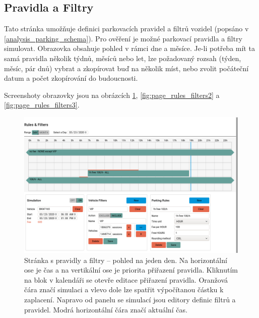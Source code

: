 \subsection{Pravidla a Filtry}

\noindent
Tato stránka umožňuje definici parkovacích pravidel a filtrů vozidel (popsáno v \ref{analysis_parking_schema}).
Pro ověření je možné parkovací pravidla a filtry simulovat.
Obrazovka obsahuje pohled v rámci dne a měsíce.
Je-li potřeba mít ta samá pravidla několik týdnů, měsíců nebo let, lze požadovaný rozsah (týden, měsíc, pár dnů) vybrat
a zkopírovat buď na několik míst, nebo zvolit počáteční datum a počet zkopírování do budoucnosti.

Screenshoty obrazovky jsou na obrázcích \ref{fig:page_rules_filters1}, \ref{fig:page_rules_filters2} a \ref{fig:page_rules_filters3}.

\begin{figure}[htb!] \centering
  \includegraphics[width=145mm]{../img/page_rules_filters1.png}
  \caption[Stránka s pravidly a filtry -- pohled na jeden den.]{Stránka s pravidly a filtry -- pohled na jeden den.
  Na horizontální ose je čas a na vertikální ose je priorita přiřazení pravidla.
  Kliknutím na blok v kalendáři se otevře editace přiřazení pravidla. Oranžová čára značí simulaci a vlevo
  dole lze spatřit výpočítanou částku k zaplacení. Napravo od panelu se simulací jsou editory definic filtrů
  a pravidel. Modrá horizontální čára značí aktuální čas.}
  \label{fig:page_rules_filters1}
\end{figure}


